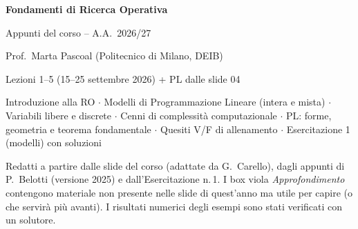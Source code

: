 \documentclass[11pt,a4paper,openany]{report}
\theoremstyle{remark}
\begin{document}
\begin{titlepage}
\centering
\vspace*{3cm}
{\Huge\bfseries Fondamenti di Ricerca Operativa\par}
\vspace{0.6cm}
{\Large Appunti del corso -- A.A.\ 2026/27\par}
\vspace{0.4cm}
{\large Prof.\ Marta Pascoal (Politecnico di Milano, DEIB)\par}
\vspace{1.5cm}
{\large Lezioni 1--5 (15--25 settembre 2026) + PL dalle slide 04\par}
\vspace{0.3cm}
\begin{minipage}{0.75\textwidth}\centering
Introduzione alla RO $\cdot$ Modelli di Programmazione Lineare (intera e mista) $\cdot$ Variabili libere e discrete $\cdot$ Cenni di complessità computazionale $\cdot$ PL: forme, geometria e teorema fondamentale $\cdot$ Quesiti V/F di allenamento $\cdot$ Esercitazione 1 (modelli) con soluzioni
\end{minipage}
\vfill
{\small Redatti a partire dalle slide del corso (adattate da G.\ Carello), dagli appunti di P.\ Belotti (versione 2025) e dall'Esercitazione n.\,1. I box viola \emph{Approfondimento} contengono materiale non presente nelle slide di quest'anno ma utile per capire (o che servirà più avanti). I risultati numerici degli esempi sono stati verificati con un solutore.\par}
\end{titlepage}

\tableofcontents









\end{document}
